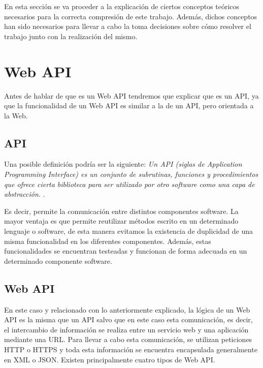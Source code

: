
En esta sección se va proceder a la explicación de ciertos conceptos teóricos necesarios para la correcta compresión de este trabajo. Además, dichos conceptos han sido necesarios para llevar a cabo la toma decisiones sobre cómo resolver el trabajo junto con la realización del mismo.


\section{Web API}

Antes de hablar de que es un Web API tendremos que explicar que es un API, ya que la funcionalidad de un Web API es similar a la de un API, pero orientada a la Web.

\subsection{API}

Una posible definición podría ser la siguiente: \emph{Un API (siglas de Application Programming Interface) es un conjunto de subrutinas, funciones y procedimientos que ofrece cierta biblioteca para ser utilizado por otro software como una capa de abstracción.} \cite{wiki:api}.





Es decir, permite la comunicación entre distintos componentes software. La mayor ventaja es que permite reutilizar métodos escrito en un determinado lenguaje o software, de esta manera evitamos la existencia de duplicidad de una misma funcionalidad en los diferentes componentes. Además, estas funcionalidades se encuentran testeadas y funcionan de forma adecuada en un determinado componente software.

\subsection{Web API}

En este caso y relacionado con lo anteriormente explicado, la lógica de un Web API es la misma que un API salvo que en este caso esta comunicación, es decir, el intercambio de información se realiza entre un servicio web y una aplicación mediante una URL. Para llevar a cabo esta comunicación, se utilizan peticiones HTTP o HTTPS y toda esta información se encuentra encapsulada generalmente en XML o JSON.
Existen principalmente cuatro tipos de Web API.

